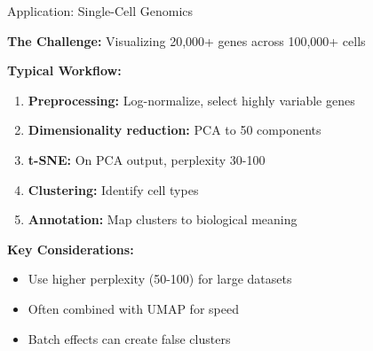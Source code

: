 \documentclass[10pt]{beamer}
\begin{document}
\begin{frame}{Application: Single-Cell Genomics}

\textbf{The Challenge:} Visualizing 20,000+ genes across 100,000+ cells

\vspace{0.2cm}
\textbf{Typical Workflow:}
\begin{enumerate}
    \setlength\itemsep{0em}
    \item \textbf{Preprocessing:} Log-normalize, select highly variable genes
    \item \textbf{Dimensionality reduction:} PCA to 50 components
    \item \textbf{t-SNE:} On PCA output, perplexity 30-100
    \item \textbf{Clustering:} Identify cell types
    \item \textbf{Annotation:} Map clusters to biological meaning
\end{enumerate}

\vspace{0.2cm}
\begin{figure}
\centering
{}
\end{figure}

\vspace{0.1cm}
\textbf{Key Considerations:}
\begin{itemize}
    \setlength\itemsep{0em}
    \item Use higher perplexity (50-100) for large datasets
    \item Often combined with UMAP for speed
    \item Batch effects can create false clusters
\end{itemize}

\end{frame}
\end{document}
